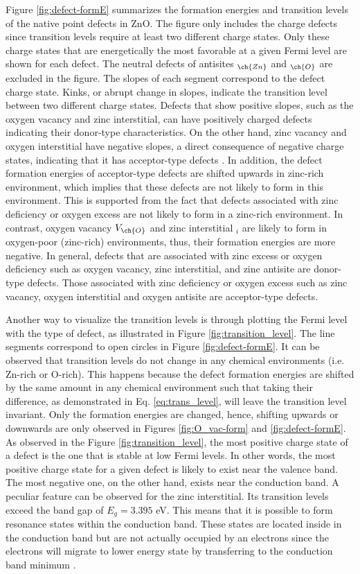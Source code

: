 Figure \ref{fig:defect-formE} summarizes the formation energies and transition levels of the native point defects in ZnO. The figure only includes the charge defects since transition levels require at least two different charge states. Only these charge states that are energetically the most favorable at a given Fermi level are shown for each defect. The neutral defects of  antisites $_{\ch{Zn}}$ and  $_{\ch{O}}$ are excluded in the figure. The slopes of each segment correspond to the defect charge state. Kinks, or abrupt change in slopes, indicate the transition level between two different charge states. Defects that show positive slopes, such as the oxygen vacancy and zinc interstitial,  can have positively charged defects indicating their donor-type characteristics. On the other hand, zinc vacancy and oxygen interstitial have negative slopes, a direct consequence of negative charge states, indicating that it has acceptor-type defects \citep{Oba2011}. In addition, the defect formation energies of  acceptor-type defects are shifted upwards in zinc-rich environment, which implies that these defects are not likely to form in this environment. This is supported from the fact that defects associated with zinc deficiency or oxygen excess are not likely to form in a zinc-rich environment. In contrast, oxygen vacancy $V_{\ch{O}}$ and zinc interstitial $_i$ are likely to form in oxygen-poor (zinc-rich) environments, thus, their formation energies are more negative. In general, defects that are associated with zinc excess or oxygen deficiency such as oxygen vacancy, zinc interstitial, and zinc antisite are donor-type defects. Those associated with zinc deficiency or  oxygen excess such as zinc vacancy, oxygen interstitial and oxygen antisite are acceptor-type defects.

Another way to visualize the transition levels is through plotting the Fermi level with the type of defect, as illustrated in Figure \ref{fig:transition_level}. The line segments correspond to open circles in Figure \ref{fig:defect-formE}. It can be observed that transition levels do not change in any chemical environments (i.e. Zn-rich or O-rich). This happens because the defect formation energies are shifted by the same amount  in any chemical environment such that taking their difference, as demonstrated in Eq. \eqref{eq:trans_level}, will leave the transition level invariant. Only the formation energies are changed, hence, shifting upwards or downwards are only observed in Figures \ref{fig:O_vac-form} and \ref{fig:defect-formE}. As observed in the Figure \ref{fig:transition_level}, the most positive charge state of a defect is the one that is stable at low Fermi levels. In other words, the most positive charge state for a given defect is likely to exist near the valence band. The most negative one, on the other hand, exists near the conduction band. A peculiar feature can be observed for the zinc interstitial. Its transition levels exceed the band gap of $E_g = 3.395$ eV. This means that it is possible to form resonance states within the conduction band. These states are located inside in the conduction band but are not actually occupied by an electrons since the electrons will migrate to lower energy state by transferring to the conduction band minimum \citep{Freysoldt2014}.

